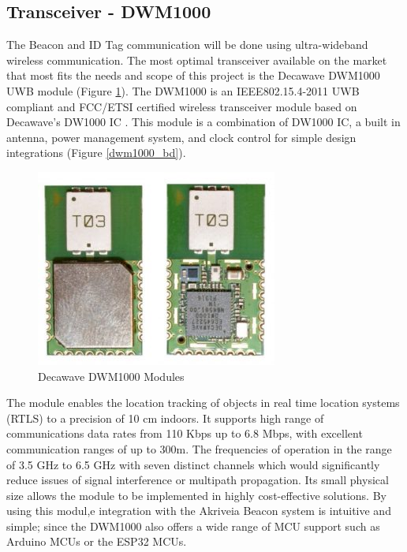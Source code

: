 \pagebreak
\subsection{Transceiver - DWM1000} 
\medskip
The Beacon and ID Tag communication will be done using ultra-wideband wireless communication. The most optimal transceiver available on the market that most fits the needs and scope of this project is the Decawave DWM1000 UWB module (Figure \ref{dwm1000}). The DWM1000 is an IEEE802.15.4-2011 UWB compliant and FCC/ETSI certified wireless transceiver module based on Decawave’s DW1000 IC \cite{R4-2-1}. This module is a combination of DW1000 IC, a built in antenna, power management system, and clock control for simple design integrations (Figure \ref{dwm1000_bd}). 

\medskip
\begin{figure}[H]
\centering
    \includegraphics[scale=0.75]{./images/dwm1000.jpg}
    \caption{Decawave DWM1000 Modules}
    \label{dwm1000}
\end{figure}

The module enables the location tracking of objects in real time location systems (RTLS) to a precision of 10 cm indoors. It supports high range of communications data rates from 110 Kbps up to 6.8 Mbps, with excellent communication ranges of up to 300m. The frequencies of operation in the range of 3.5 GHz to 6.5 GHz with seven distinct channels which would significantly reduce issues of signal interference or multipath propagation. Its small physical size allows the module to be implemented in highly cost-effective solutions. By using this modul,e integration with the Akriveia Beacon system is intuitive and simple; since the DWM1000 also offers a wide range of MCU support such as Arduino MCUs or the ESP32 MCUs. 

